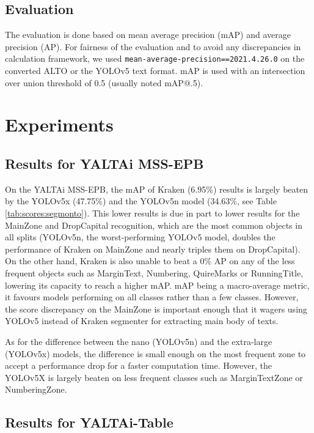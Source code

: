 \documentclass{jdmdh}
\begin{document}
\subsection{Evaluation}

The evaluation is done based on mean average precision (mAP) and average precision (AP). For fairness of the evaluation and to avoid any discrepancies in calculation framework, we used \texttt{mean-average-precision==2021.4.26.0} on the converted ALTO or the YOLOv5 text format. mAP is used with an intersection over union threshold of 0.5 (usually noted mAP@.5).

\section{Experiments}

\subsection{Results for YALTAi MSS-EPB}

On the YALTAi MSS-EPB, the mAP of Kraken (6.95\%) results is largely beaten by the YOLOv5x (47.75\%) and the YOLOv5n model (34.63\%, see Table \ref{tab:scores:segmonto}). This lower results is due in part to lower results for the MainZone and DropCapital recognition, which are the most common objects in all splits (YOLOv5n, the worst-performing YOLOv5 model, doubles the performance of Kraken on MainZone and nearly triples them on DropCapital). On the other hand, Kraken is also unable to beat a 0\% AP on any of the less frequent objects such as MarginText, Numbering, QuireMarks or RunningTitle, lowering its capacity to reach a higher mAP. mAP being a macro-average metric, it favours models performing on all classes rather than a few classes. However, the score discrepancy on the MainZone is important enough that it wagers using YOLOv5 instead of Kraken segmenter for extracting main body of texts.

As for the difference between the nano (YOLOv5n) and the extra-large (YOLOv5x) models, the difference is small enough on the most frequent zone to accept a performance drop for a faster computation time. However, the YOLOv5X is largely beaten on less frequent classes such as MarginTextZone or NumberingZone.

\subsection{Results for YALTAi-Table}
\end{document}
